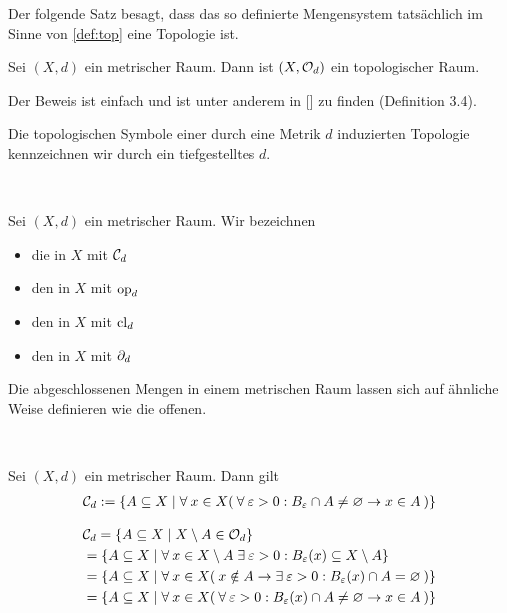     Der folgende Satz besagt, dass das so definierte Mengensystem tatsächlich im Sinne von \ref{def:top} eine Topologie ist.
    \begin{satz}
        Sei $(X,d)$ ein metrischer Raum. Dann ist $(X,\mathcal{O}_d)$ ein topologischer Raum.
    \end{satz}
    Der Beweis ist einfach und ist unter anderem in [\cite{manetti-m-2015--a}] zu finden (Definition 3.4).

    Die topologischen Symbole einer durch eine Metrik $d$ induzierten Topologie kennzeichnen wir durch ein tiefgestelltes $d$.
    \begin{nota} \ \vspace{8pt}

        \noindent
        Sei $(X,d)$ ein metrischer Raum. Wir bezeichnen 
        \begin{itemize}
        \item die  in $X$ mit $\mathcal{C}_d$
        \item den  in $X$ mit $\text{op}_d$
        \item den  in $X$ mit $\text{cl}_d$
        \item den  in $X$ mit $\partial_d$
        \end{itemize}
    \end{nota}


    Die abgeschlossenen Mengen in einem metrischen Raum lassen sich auf ähnliche Weise definieren wie die offenen.
    \begin{satz} \label{satz:Cd} \ \hspace{8pt}

        \noindent
        Sei $(X,d)$ ein metrischer Raum. Dann gilt
        \begin{align*}
            \mathcal{C}_d := \{A \subseteq X \mid \forall\: x \in X (\: \forall\: \varepsilon > 0 : B_\varepsilon \cap A \neq \varnothing \rightarrow x \in A \:) \}
        \end{align*}
        
    \end{satz}
    \begin{bew}
        \begin{align*}
            &\mathcal{C}_d = \{A \subseteq X \mid X \setminus A \in \mathcal{O}_d\} \\
            &= \{A \subseteq X \mid \forall\: x \in X \setminus A \; \exists\: \varepsilon > 0 : B_\varepsilon(x) \subseteq X \setminus A\} \\
            &= \{A \subseteq X \mid \forall\: x \in X (\: x \notin A \rightarrow \exists\: \varepsilon > 0 : B_\varepsilon(x) \cap A = \varnothing \:) \} \\
            &= \{A \subseteq X \mid \forall\: x \in X (\: \forall\: \varepsilon > 0 : B_\varepsilon(x) \cap A \neq \varnothing \rightarrow x \in A \:) \} 
        \end{align*}
    \end{bew}



